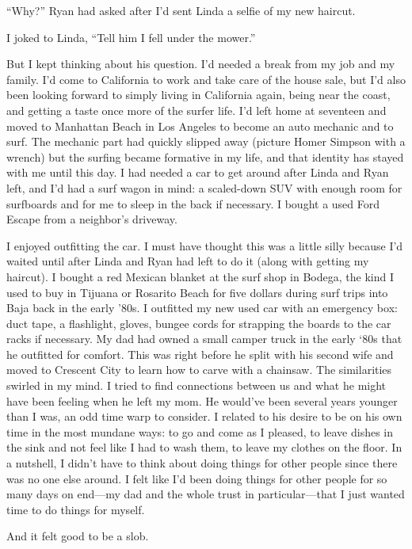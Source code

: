 \documentclass[12pt]{book}
\begin{document}
``Why?'' Ryan had asked after I'd sent Linda a selfie of my new haircut.

I joked to Linda, ``Tell him I fell under the mower.''

But I kept thinking about his question. I'd needed a break from my job and my family. I'd come to California to work and take care of the house sale, but I'd also been looking forward to simply living in California again, being near the coast, and getting a taste once more of the surfer life. I'd left home at seventeen and moved to Manhattan Beach in Los Angeles to become an auto mechanic and to surf. The mechanic part had quickly slipped away (picture Homer Simpson with a wrench) but the surfing became formative in my life, and that identity has stayed with me until this day. I had needed a car to get around after Linda and Ryan left, and I'd had a surf wagon in mind: a scaled-down SUV with enough room for surfboards and for me to sleep in the back if necessary. I bought a used Ford Escape from a neighbor's driveway.

I enjoyed outfitting the car. I must have thought this was a little silly because I'd waited until after Linda and Ryan had left to do it (along with getting my haircut). I bought a red Mexican blanket at the surf shop in Bodega, the kind I used to buy in Tijuana or Rosarito Beach for five dollars during surf trips into Baja back in the early '80s. I outfitted my new used car with an emergency box: duct tape, a flashlight, gloves, bungee cords for strapping the boards to the car racks if necessary. My dad had owned a small camper truck in the early `80s that he outfitted for comfort. This was right before he split with his second wife and moved to Crescent City to learn how to carve with a chainsaw. The similarities swirled in my mind. I tried to find connections between us and what he might have been feeling when he left my mom. He would've been several years younger than I was, an odd time warp to consider. I related to his desire to be on his own time in the most mundane ways: to go and come as I pleased, to leave dishes in the sink and not feel like I had to wash them, to leave my clothes on the floor. In a nutshell, I didn't have to think about doing things for other people since there was no one else around. I felt like I'd been doing things for other people for so many days on end---my dad and the whole trust in particular---that I just wanted time to do things for myself.

And it felt good to be a slob.
\end{document}
